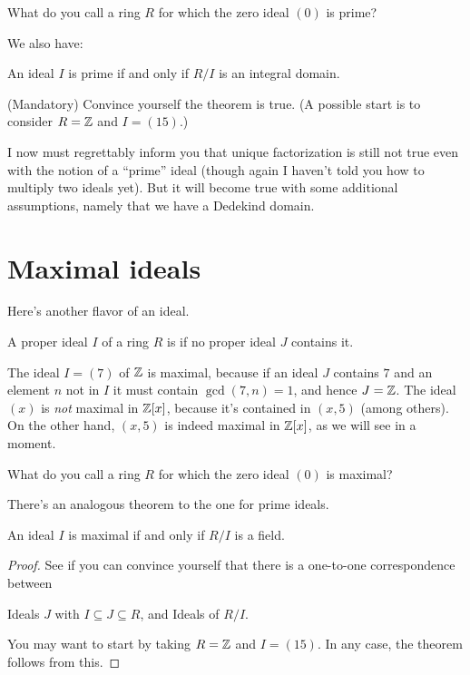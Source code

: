 \begin{exercise}
	What do you call a ring $R$ for which the zero ideal $(0)$ is prime?
\end{exercise}

We also have:
\begin{theorem}
	An ideal $I$ is prime if and only if $R/I$ is an integral domain.
\end{theorem}
\begin{exercise}
	(Mandatory) Convince yourself the theorem is true.
	(A possible start is to consider $R = \mathbb Z$ and $I = (15)$.)
\end{exercise}

I now must regrettably inform you that unique factorization is still
not true even with the notion of a ``prime'' ideal
(though again I haven't told you how to multiply two ideals yet).
But it will become true with some additional assumptions,
namely that we have a Dedekind domain.

\section{Maximal ideals}
Here's another flavor of an ideal.
\begin{definition}
	A proper ideal $I$ of a ring $R$ is  if
	no proper ideal $J$ contains it.
\end{definition}
\begin{example}
	\listhack
	\begin{enumerate}[(a)]
		\ii The ideal $I = (7)$ of $\mathbb Z$ is maximal, because
		if an ideal $J$ contains $7$
		and an element $n$ not in $I$
		it must contain $\gcd(7,n) = 1$, and hence $J = \mathbb Z$.
		\ii The ideal $(x)$ is \emph{not} maximal in $\mathbb Z[x]$,
		because it's contained in $(x,5)$ (among others).
		\ii On the other hand, $(x,5)$ is indeed maximal in $\mathbb Z[x]$,
		as we will see in a moment.
	\end{enumerate}
\end{example}

\begin{exercise}
	What do you call a ring $R$ for which the zero ideal $(0)$ is maximal?
\end{exercise}

There's an analogous theorem to the one for prime ideals.
\begin{theorem}
	An ideal $I$ is maximal if and only if $R/I$ is a field.
\end{theorem}
\begin{proof}
	See if you can convince yourself that
	there is a one-to-one correspondence between
	\begin{enumerate}[(i)]
		\ii Ideals $J$ with $I \subseteq J \subseteq R$, and
		\ii Ideals of $R/I$.
	\end{enumerate}
	You may want to start by taking $R = \mathbb Z$ and $I = (15)$.
	In any case, the theorem follows from this.
\end{proof}

